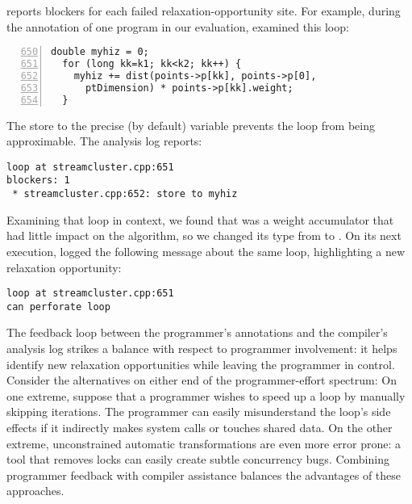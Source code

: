 \sysname reports blockers for each failed
relaxation-opportunity site. For example, during the annotation of one program
in our evaluation, \sysname examined this loop:
%
\begin{lstlisting}[numbers=left,firstnumber=650,numbersep=-1pt,numberstyle=\sffamily]
  double myhiz = 0;
  for (long kk=k1; kk<k2; kk++) {
    myhiz += dist(points->p[kk], points->p[0],
      ptDimension) * points->p[kk].weight;
  }
\end{lstlisting}
%
The store to the precise (by default) variable 
prevents the loop from being approximable. The analysis log reports:
%
\begin{lstlisting}
loop at streamcluster.cpp:651
blockers: 1
 * streamcluster.cpp:652: store to myhiz
\end{lstlisting}
%
Examining that loop in context, we found that  was a weight
accumulator that had little impact on the algorithm, so we changed its type from
 to . On its next execution, \sysname logged the
following message about the same loop, highlighting a new relaxation
opportunity:
%
\begin{lstlisting}
loop at streamcluster.cpp:651
can perforate loop
\end{lstlisting}
%
The feedback loop between the programmer's annotations and the compiler's
analysis log strikes a balance with respect to programmer involvement: it helps
identify new relaxation opportunities while leaving the programmer in control.
%
Consider the alternatives on either end of the programmer-effort spectrum:
On one extreme, suppose that a programmer wishes to speed up a loop by manually
skipping iterations.  The programmer can easily misunderstand the loop's side
effects if it indirectly makes system calls or touches shared data.
%
On the other extreme, unconstrained automatic transformations are even more
error prone: a tool that removes locks can easily create subtle concurrency
bugs.
%
Combining programmer feedback with compiler assistance balances the
advantages of these approaches.
